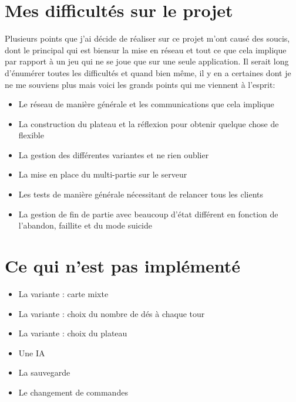 \documentclass[12pt, openany]{report}
\begin{document}
    \section{Mes difficultés sur le projet}
    Plusieurs points que j'ai décide de réaliser sur ce projet m'ont causé des soucis, dont le principal qui est biensur la mise en réseau et tout ce que cela implique par rapport à un jeu qui ne se joue que sur une seule application.
Il serait long d'énumérer toutes les difficultés et quand bien même, il y en a certaines dont je ne me souviens plus mais voici les grands points qui me viennent à l'esprit:
      \begin{itemize}
        \item Le réseau de manière générale et les communications que cela implique
        \item La construction du plateau et la réflexion pour obtenir quelque chose de flexible
        \item La gestion des différentes variantes et ne rien oublier
        \item La mise en place du multi-partie sur le serveur
	\item Les tests de manière générale nécessitant de relancer tous les clients
	\item La gestion de fin de partie avec beaucoup d'état différent en fonction de l'abandon, faillite et du mode suicide
      \end{itemize}

    \section{Ce qui n'est pas implémenté}
      \begin{itemize}
        \item La variante : carte mixte
        \item La variante : choix du nombre de dés à chaque tour
	\item La variante : choix du plateau
	\item Une IA
	\item La sauvegarde
	\item Le changement de commandes 
      \end{itemize}
\end{document}
